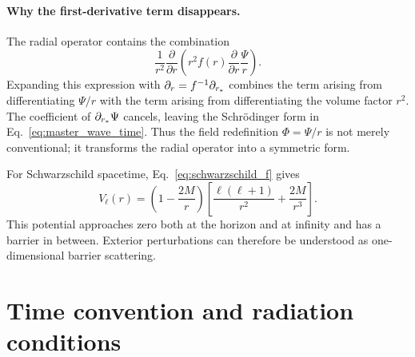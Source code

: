 \paragraph{Why the first-derivative term disappears.}
The radial operator contains the combination
\begin{equation}
\frac{1}{r^2}
\frac{\partial}{\partial r}
\left(
r^2f(r)
\frac{\partial}{\partial r}
\frac{\Psi}{r}
\right).
\end{equation}
Expanding this expression with $\partial_r=f^{-1}\partial_{r_*}$ combines the term arising from differentiating $\Psi/r$ with the term arising from differentiating the volume factor $r^2$. The coefficient of $\partial_{r_*}\Psi$ cancels, leaving the Schr\"odinger form in Eq.~\eqref{eq:master_wave_time}. Thus the field redefinition $\Phi=\Psi/r$ is not merely conventional; it transforms the radial operator into a symmetric form.

For Schwarzschild spacetime, Eq.~\eqref{eq:schwarzschild_f} gives
\begin{equation}
V_\ell(r)
=
\left(1-\frac{2M}{r}\right)
\left[
\frac{\ell(\ell+1)}{r^2}
+\frac{2M}{r^3}
\right].
\label{eq:schwarzschild_scalar_potential}
\end{equation}
This potential approaches zero both at the horizon and at infinity and has a barrier in between. Exterior perturbations can therefore be understood as one-dimensional barrier scattering.

\section{Time convention and radiation conditions}

